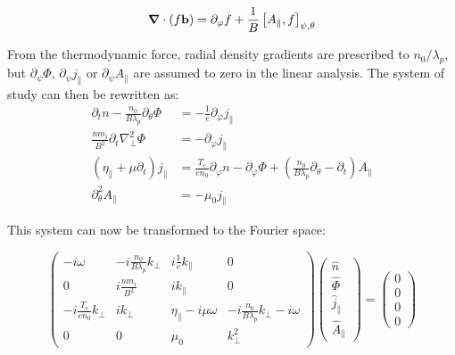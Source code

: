 \begin{equation}
	\grad \cdot (f\mathbf{b}) = \partial_\varphi f + \frac{1}{B}\left[A_\parallel,f\right]_{\psi,\theta}
\end{equation}

From the thermodynamic force, radial density gradients are prescribed to $n_0 / \lambda_p$, but $\partial_\psi\Phi$, $\partial_\psi j_\parallel$ or $\partial_\psi A_\parallel$ are assumed to zero in the linear analysis. The system of study can then be rewritten as:
\begin{align}
	\partial_t n - \frac{n_0}{B\lambda_p}\partial_\theta\Phi &= -\frac{1}{e}\partial_\varphi j_\parallel \\
	\frac{nm_i}{B^2}\partial_t\nabla_\perp^2\Phi &= -\partial_\varphi j_\parallel \\
	\left(\eta_\parallel + \mu\partial_t \right) j_\parallel &= \frac{T_e}{en_0}\partial_\varphi n - \partial_\varphi \Phi  + \left(\frac{n_0}{B\lambda_p}\partial_\theta - \partial_t\right) A_\parallel \\
	\partial_\theta^2 A_\parallel &= -\mu_0 j_\parallel
\end{align}

This system can now be transformed to the Fourier space:

\begin{equation}
	\begin{pmatrix}
		-i\omega                  & -i\frac{n_0}{B\lambda_p}k_\perp     & i\frac{1}{e}k_\parallel & 0                  \\ 
		0                         & i\frac{nm_i}{B^2}             & ik_\parallel            & 0                  \\ 
		-i\frac{T_e}{en_0}k_\perp & ik_\perp & \eta_\parallel - i\mu\omega & -i\frac{n_0}{B\lambda_p}k_\perp - i\omega \\ 
		0                         & 0                             & \mu_0                   & k_\perp^2
	\end{pmatrix}\begin{pmatrix}
		\hat{n} \\ \hat{\Phi} \\ \hat{j}_\parallel \\ \hat{A}_\parallel
	\end{pmatrix} = \begin{pmatrix}
		0 \\ 0 \\ 0 \\ 0
 	\end{pmatrix}
\end{equation}



